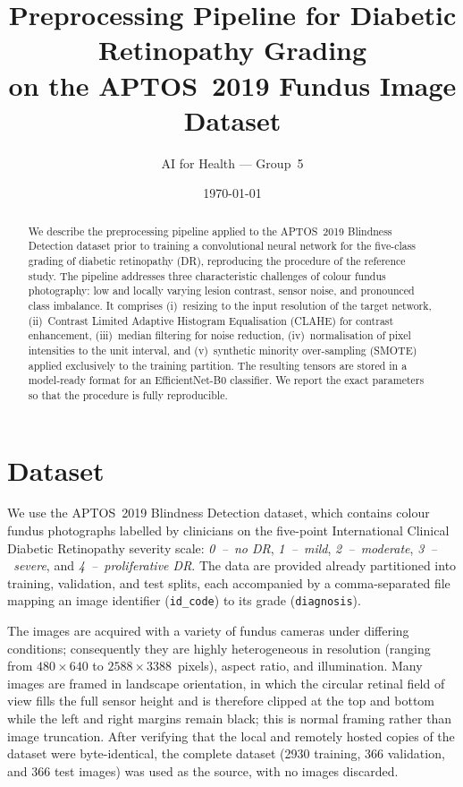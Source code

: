 \documentclass[11pt,a4paper]{article}
\title{Preprocessing Pipeline for Diabetic Retinopathy Grading\\
on the APTOS~2019 Fundus Image Dataset}
\author{AI for Health --- Group~5}
\date{\today}
\begin{document}
\maketitle

\begin{abstract}
We describe the preprocessing pipeline applied to the APTOS~2019 Blindness
Detection dataset prior to training a convolutional neural network for the
five-class grading of diabetic retinopathy (DR), reproducing the procedure of
the reference study. The pipeline addresses three characteristic challenges of
colour fundus photography: low and locally varying lesion contrast, sensor
noise, and pronounced class imbalance. It comprises (i)~resizing to the input
resolution of the target network, (ii)~Contrast Limited Adaptive Histogram
Equalisation (CLAHE) for contrast enhancement, (iii)~median filtering for noise
reduction, (iv)~normalisation of pixel intensities to the unit interval, and
(v)~synthetic minority over-sampling (SMOTE) applied exclusively to the
training partition. The resulting tensors are stored in a model-ready format
for an EfficientNet-B0 classifier. We report the exact parameters so that the
procedure is fully reproducible.
\end{abstract}

\section{Dataset}
\label{sec:dataset}

We use the APTOS~2019 Blindness Detection dataset, which contains colour
fundus photographs labelled by clinicians on the five-point International
Clinical Diabetic Retinopathy severity scale: \emph{0~--~no DR},
\emph{1~--~mild}, \emph{2~--~moderate}, \emph{3~--~severe}, and
\emph{4~--~proliferative DR}. The data are provided already partitioned into
training, validation, and test splits, each accompanied by a comma-separated
file mapping an image identifier (\texttt{id\_code}) to its grade
(\texttt{diagnosis}).

The images are acquired with a variety of fundus cameras under differing
conditions; consequently they are highly heterogeneous in resolution
(ranging from $480\times640$ to $2588\times3388$~pixels), aspect ratio, and
illumination. Many images are framed in landscape orientation, in which the
circular retinal field of view fills the full sensor height and is therefore
clipped at the top and bottom while the left and right margins remain black;
this is normal framing rather than image truncation. After verifying that the
local and remotely hosted copies of the dataset were byte-identical, the
complete dataset (\num{2930} training, \num{366} validation, and \num{366} test
images) was used as the source, with no images discarded.
\end{document}
